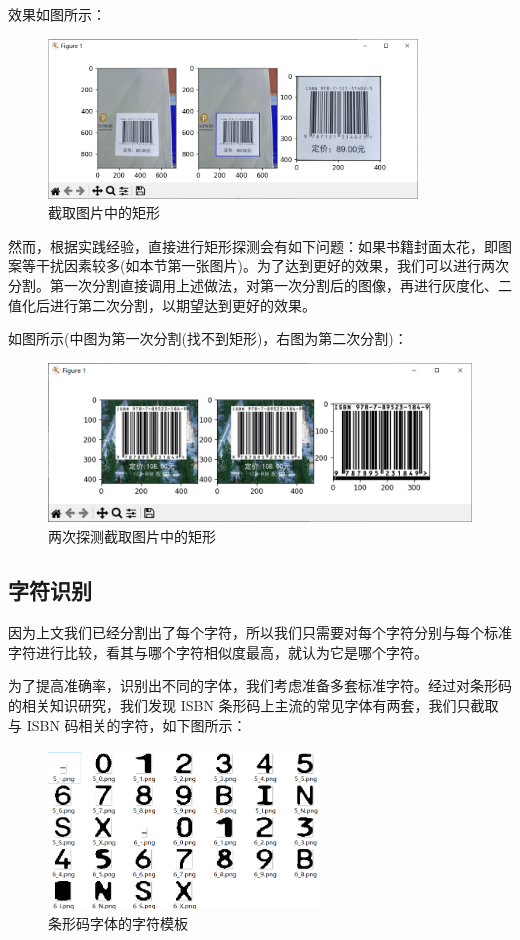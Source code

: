 \documentclass{ctexart}
\begin{document}
效果如图所示：

\begin{figure}[H]
    \centering
    \includegraphics[height=120pt]{sample_graphSplit}
    \caption{截取图片中的矩形}
\end{figure}

然而，根据实践经验，直接进行矩形探测会有如下问题：如果书籍封面太花，即图案等干扰因素较多(如本节第一张图片)。为了达到更好的效果，我们可以进行两次分割。第一次分割直接调用上述做法，对第一次分割后的图像，再进行灰度化、二值化后进行第二次分割，以期望达到更好的效果。

如图所示(中图为第一次分割(找不到矩形)，右图为第二次分割)：

\begin{figure}[H]
    \centering
    \includegraphics[height=120pt]{sample_graphSplit2}
    \caption{两次探测截取图片中的矩形}
\end{figure}


\subsection{字符识别}

因为上文我们已经分割出了每个字符，所以我们只需要对每个字符分别与每个标准字符进行比较，看其与哪个字符相似度最高，就认为它是哪个字符。

为了提高准确率，识别出不同的字体，我们考虑准备多套标准字符。经过对条形码的相关知识研究，我们发现 ISBN 条形码上主流的常见字体有两套，我们只截取与 ISBN 码相关的字符，如下图所示：

\begin{figure}[H]
    \centering
    \includegraphics[height=120pt]{standard_fonts2}
    \caption{条形码字体的字符模板}
\end{figure}
\end{document}
